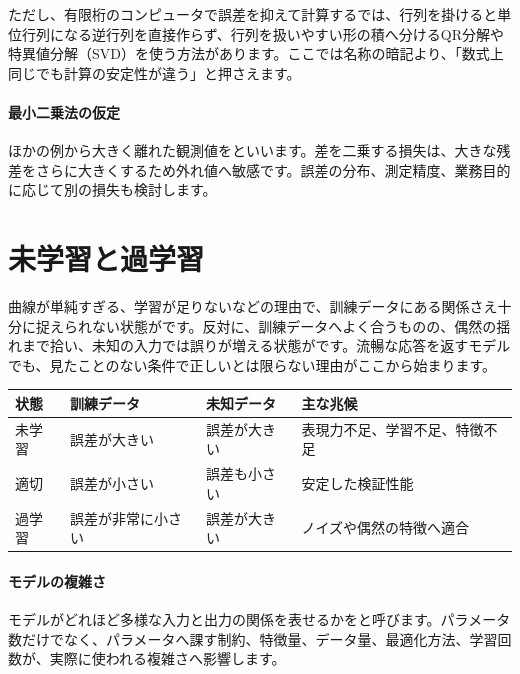         ただし、有限桁のコンピュータで誤差を抑えて計算するでは、行列を掛けると単位行列になる逆行列を直接作らず、行列を扱いやすい形の積へ分けるQR分解や特異値分解（SVD）を使う方法があります。ここでは名称の暗記より、「数式上同じでも計算の安定性が違う」と押さえます。

\paragraph{最小二乗法の仮定}
        ほかの例から大きく離れた観測値をといいます。差を二乗する損失は、大きな残差をさらに大きくするため外れ値へ敏感です。誤差の分布、測定精度、業務目的に応じて別の損失も検討します。

\par
\endgroup
\par
\endgroup


\section{未学習と過学習}
\label{sec:06-machine-learning-10}

曲線が単純すぎる、学習が足りないなどの理由で、訓練データにある関係さえ十分に捉えられない状態がです。反対に、訓練データへよく合うものの、偶然の揺れまで拾い、未知の入力では誤りが増える状態がです。流暢な応答を返すモデルでも、見たことのない条件で正しいとは限らない理由がここから始まります。

\begingroup
  \noindent
  \begin{tabularx}{\textwidth}{@{}lYYY@{}}
    \toprule
    状態 & 訓練データ & 未知データ & 主な兆候\\
    \midrule
    未学習 & 誤差が大きい & 誤差が大きい & 表現力不足、学習不足、特徴不足\\
    適切 & 誤差が小さい & 誤差も小さい & 安定した検証性能\\
    過学習 & 誤差が非常に小さい & 誤差が大きい & ノイズや偶然の特徴へ適合\\
    \bottomrule
  \end{tabularx}
  \vspace{4mm}
\begingroup
\paragraph{モデルの複雑さ}
        モデルがどれほど多様な入力と出力の関係を表せるかをと呼びます。パラメータ数だけでなく、パラメータへ課す制約、特徴量、データ量、最適化方法、学習回数が、実際に使われる複雑さへ影響します。

